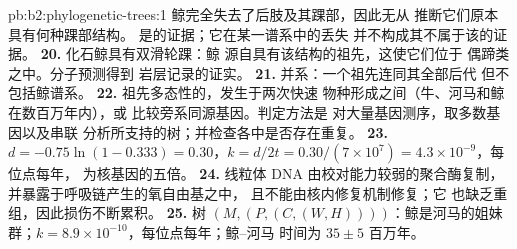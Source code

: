 \begin{solution}{pb:b2:phylogenetic-trees:1}
鲸完全失去了后肢及其踝部，因此无从
推断它们原本具有何种踝部结构。
是的证据；它在某一谱系中的丢失
并不构成其不属于该的证据。
\textbf{20.} 化石鲸具有双滑轮踝：鲸
源自具有该结构的祖先，这使它们位于
偶蹄类之中。分子预测得到
岩层记录的证实。
\textbf{21.} 并系：一个祖先连同其全部后代
但不包括鲸谱系。
\textbf{22.} 祖先多态性的，发生于两次快速
物种形成之间（牛、河马和鲸在数百万年内），或
比较旁系同源基因。判定方法是
对大量基因测序，取多数基因以及串联
分析所支持的树；并检查各中是否存在重复。
\textbf{23.} $d = -0.75\ln(1 - 0.333) = 0.30$，$k = d/2t =
0.30/(7\times 10^{7}) = 4.3\times 10^{-9}$，每位点每年，
为核基因的五倍。
\textbf{24.} 线粒体 DNA 由校对能力较弱的聚合酶复制，
并暴露于呼吸链产生的氧自由基之中，
且不能由核内修复机制修复；它
也缺乏重组，因此损伤不断累积。
\textbf{25.} 树 $(M,(P,(C,(W,H))))$：鲸是河马的姐妹
群；$k = 8.9\times 10^{-10}$，每位点每年；鲸–河马
时间为 $35 \pm 5$ 百万年。
\end{solution}
